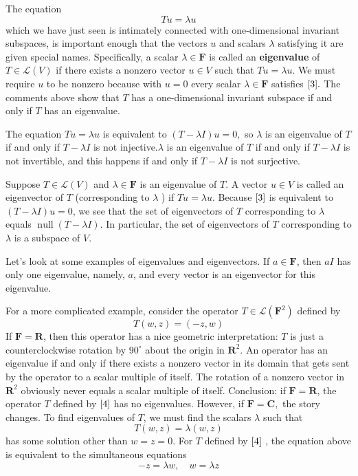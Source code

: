 \documentclass[12pt]{book}
\theoremstyle{definition}\newtheorem{dfn}{Définition}[chapter]
\theoremstyle{plain}\newtheorem{thm}{Théorème}[chapter]
\theoremstyle{plain}\newtheorem{prp}{Proposition}[chapter]
\theoremstyle{plain}\newtheorem{lem}{\bf Lemme}[chapter]
\theoremstyle{plain}\newtheorem{axm}{\bf Axiome}[chapter]
\theoremstyle{plain}\newtheorem{lmm}{\bf Lemme}[chapter]
\theoremstyle{plain}\newtheorem{exm}{\bf Example}[chapter]
\theoremstyle{plain}\newtheorem{cor}{\bf Corollaire}[chapter]
\theoremstyle{remark}\newtheorem{rem}{Remarque}[chapter]
\begin{document}
The equation
\begin{equation}
T u=\lambda u\label{3}
\end{equation}
which we have just seen is intimately connected with one-dimensional invariant subspaces, is important enough that the vectors $u$ and scalars $\lambda$ satisfying it are given special names. Specifically, a scalar $\lambda \in \mathbf{F}$ is called an \textbf{eigenvalue} of $T \in \mathcal{L}(V)$ if there exists a nonzero vector $u \in V$ such that $T u=\lambda u .$ We must require $u$ to be nonzero because with $u=0$ every scalar $\lambda \in \mathbf{F}$ satisfies $\ref{3}.$ The comments above show that $T$ has a one-dimensional invariant subspace if and only if $T$ has an eigenvalue.

The equation $T u=\lambda u$ is equivalent to $(T-\lambda I) u=0,$ so $\lambda$ is an eigenvalue of $T$ if and only if $T-\lambda I$ is not injective.$\lambda$ is an eigenvalue of $T$ if and only if $T-\lambda I$ is not invertible, and this happens if and only if $T-\lambda I$ is not surjective.

Suppose $T \in \mathcal{L}(V)$ and $\lambda \in \mathbf{F}$ is an eigenvalue of $T .$ A vector $u \in V$ is called an eigenvector of $T$ (corresponding to $\lambda$ ) if $T u=\lambda u$. Because $\ref{3}$ is equivalent to $(T-\lambda I) u=0$, we see that the set of eigenvectors of $T$ corresponding to $\lambda$ equals $\operatorname{null}(T-\lambda I) .$ In particular, the set of eigenvectors of $T$ corresponding to $\lambda$ is a subspace of $V$.

Let's look at some examples of eigenvalues and eigenvectors. If $a \in \mathbf{F}$, then $a I$ has only one eigenvalue, namely, $a$, and every vector is an eigenvector for this eigenvalue.

For a more complicated example, consider the operator $T \in \mathcal{L}\left(\mathbf{F}^{2}\right)$ defined by
\begin{equation}
T(w, z)=(-z, w)\label{4}
\end{equation}
If $\mathbf{F}=\mathbf{R}$, then this operator has a nice geometric interpretation: $T$ is just a counterclockwise rotation by $90^{\circ}$ about the origin in $\mathbf{R}^{2} .$ An operator has an eigenvalue if and only if there exists a nonzero vector in its domain that gets sent by the operator to a scalar multiple of itself. The rotation of a nonzero vector in $\mathbf{R}^{2}$ obviously never equals a scalar multiple of itself. Conclusion: if $\mathbf{F}=\mathbf{R}$, the operator $T$ defined by $\ref{4}$
has no eigenvalues. However, if $\mathbf{F}=\mathbf{C},$ the story changes. To find eigenvalues of $T$, we must find the scalars $\lambda$ such that
$$
T(w, z)=\lambda(w, z)
$$
has some solution other than $w=z=0$. For $T$ defined by $\ref{4}$ , the equation above is equivalent to the simultaneous equations
\begin{equation}
-z=\lambda w, \quad w=\lambda z\label{5}
\end{equation}
\end{document}
